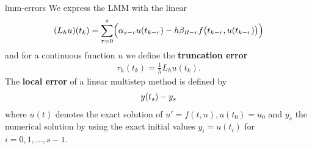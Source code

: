 \begin{Definition}{lmm-errors}
  We express the LMM with the linear 
  \begin{gather}
    \label{eq:lmm:9}
    (L_hu)(t_k) = \sum_{r=0}^{s}\Bigl(\alpha_{s-r} u(t_{k-r}) - h
    \beta_{R-r} f\bigl(t_{k-r},u(t_{k-r})\bigr)\Bigr)
  \end{gather}
  and for a continuous function $u$ we define the \textbf{truncation
    error}
  \begin{gather}
    \label{eq:lmm:10}
    \tau_h(t_k) = \tfrac1hL_hu(t_k).
  \end{gather}
  The \textbf{local error}  of a linear multistep method is defined by
  \begin{gather*}
    y(t_s) - y_s
  \end{gather*}
  where $u(t)$ denotes the exact solution of $u' = f(t,u), u(t_0)=u_0$
  and $y_s$ the numerical solution by using the exact initial values
 	$y_i = u(t_i)$ for $i = 0,1,...,s-1$.
\end{Definition}


